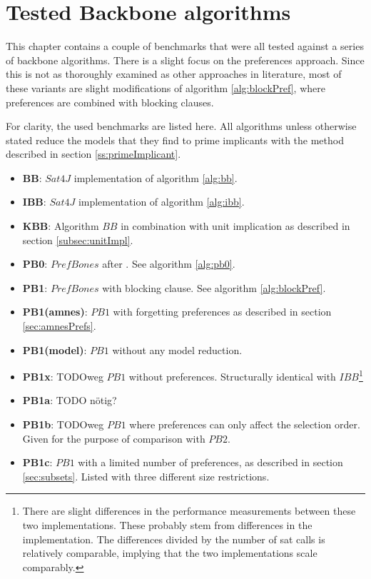 \section{Tested Backbone algorithms}

This chapter contains a couple of benchmarks that were all tested against a series of backbone algorithms. There is a slight focus on the preferences approach. Since this is not as thoroughly examined as other approaches in literature, most of these variants are slight modifications of algorithm \ref{alg:blockPref}, where preferences are combined with blocking clauses.

For clarity, the used benchmarks are listed here. All algorithms unless otherwise stated reduce the models that they find to prime implicants with the method described in section \ref{ss:primeImplicant}.
\begin{itemize}
\item \textbf{BB}: $Sat4J$ implementation of algorithm \ref{alg:bb}.
\item \textbf{IBB}: $Sat4J$ implementation of algorithm \ref{alg:ibb}.
\item \textbf{KBB}: Algorithm $BB$ in combination with unit implication as described in section \ref{subsec:unitImpl}. 
\item \textbf{PB0}: $PrefBones$ after \cite{PJ18}. See algorithm \ref{alg:pb0}.
\item \textbf{PB1}: $PrefBones$ with blocking clause. See algorithm \ref{alg:blockPref}.
\item \textbf{PB1(amnes)}: $PB1$ with forgetting preferences as described in section \ref{sec:amnesPrefs}.
\item \textbf{PB1(model)}: $PB1$ without any model reduction.
\item \textbf{PB1x}: TODOweg $PB1$ without preferences. Structurally identical with $IBB$\footnote{There are slight differences in the performance measurements between these two implementations. These probably stem from differences in the implementation. The differences divided by the number of sat calls is relatively comparable, implying that the two implementations scale comparably.}
\item \textbf{PB1a}: TODO nötig?
\item \textbf{PB1b}: TODOweg $PB1$ where preferences can only affect the selection order. Given for the purpose of comparison with $PB2$.
\item \textbf{PB1c}: $PB1$ with a limited number of preferences, as described in section \ref{sec:subsets}. Listed with three different size restrictions.

\end{itemize}
